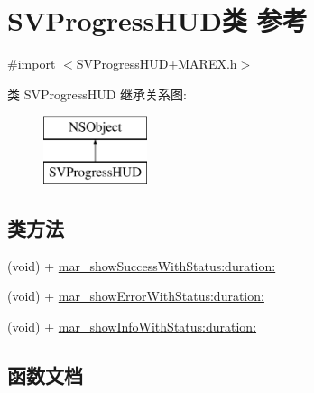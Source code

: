 \hypertarget{interface_s_v_progress_h_u_d}{}\section{S\+V\+Progress\+H\+U\+D类 参考}
\label{interface_s_v_progress_h_u_d}


{\ttfamily \#import $<$S\+V\+Progress\+H\+U\+D+\+M\+A\+R\+E\+X.\+h$>$}

类 S\+V\+Progress\+H\+UD 继承关系图\+:\begin{figure}[H]
\begin{center}
\leavevmode
\includegraphics[height=2.000000cm]{interface_s_v_progress_h_u_d}
\end{center}
\end{figure}
\subsection*{类方法}
\begin{DoxyCompactItemize}
\item 
(void) + \hyperlink{interface_s_v_progress_h_u_d_ae491ec01660d2a0315fc1ea6762e330f}{mar\+\_\+show\+Success\+With\+Status\+:duration\+:}
\item 
(void) + \hyperlink{interface_s_v_progress_h_u_d_ab43fef2e5596adb5b8e60c0e5cbd88f0}{mar\+\_\+show\+Error\+With\+Status\+:duration\+:}
\item 
(void) + \hyperlink{interface_s_v_progress_h_u_d_a352dd25a4e227cb05fd76b00c1b397ae}{mar\+\_\+show\+Info\+With\+Status\+:duration\+:}
\end{DoxyCompactItemize}


\subsection{函数文档}
\mbox{\label{interface_s_v_progress_h_u_d_ab43fef2e5596adb5b8e60c0e5cbd88f0}} 
